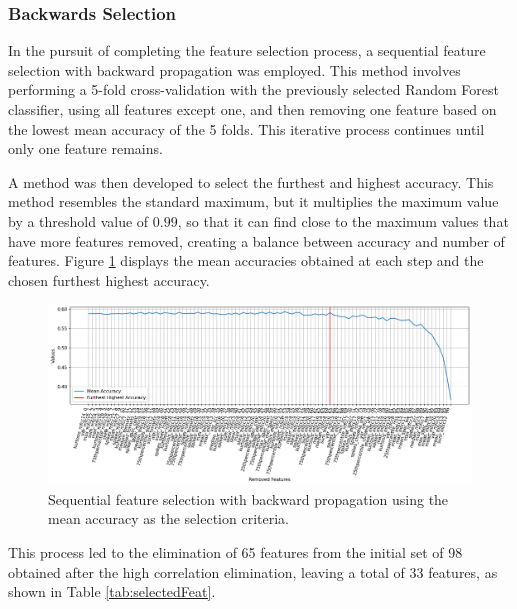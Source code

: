 \subsubsection{Backwards Selection}

In the pursuit of completing the feature selection process, a sequential feature selection with backward propagation was employed. This method involves performing a 5-fold cross-validation with the previously selected Random Forest classifier, using all features except one, and then removing one feature based on the lowest mean accuracy of the 5 folds. This iterative process continues until only one feature remains.

A method was then developed to select the furthest and highest accuracy. This method resembles the standard maximum, but it multiplies the maximum value by a threshold value of $0.99$, so that it can find close to the maximum values that have more features removed, creating a balance between accuracy and number of features. Figure \ref{fig:backProp1} displays the mean accuracies obtained at each step and the chosen furthest highest accuracy.

\begin{figure}[H]
	\centering
	\includegraphics[width=1\linewidth]{figs/4_1_traditional/backProp1.png}
	\caption{Sequential feature selection with backward propagation using the mean accuracy as the selection criteria.}
	\label{fig:backProp1}
\end{figure}

This process led to the elimination of 65 features from the initial set of 98 obtained after the high correlation elimination, leaving a total of 33 features, as shown in Table \ref{tab:selectedFeat}.

